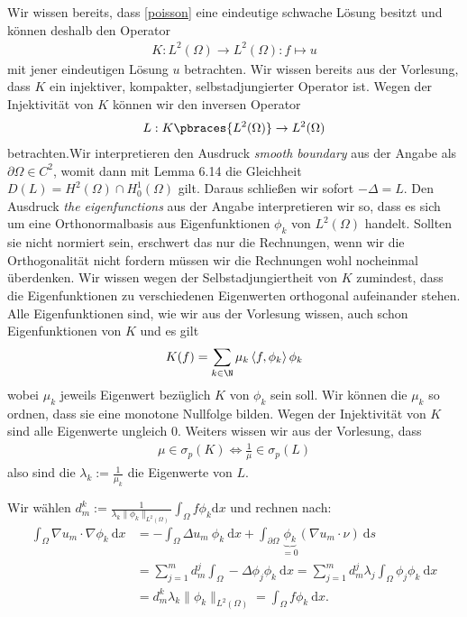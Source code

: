 \begin{solution}

	Wir wissen bereits, dass \eqref{poisson} eine eindeutige schwache Lösung besitzt und können deshalb den Operator
	\begin{align*}
	K: L^2(\Omega) \to L^2(\Omega): f \mapsto u
	\end{align*}
	mit jener eindeutigen Lösung $u$ betrachten. Wir wissen bereits aus der Vorlesung, dass $K$ ein injektiver, kompakter, selbstadjungierter Operator ist. Wegen der Injektivität von $K$ können wir den inversen Operator
	\begin{align*}
	L: K\pbraces{L^2(\Omega)} \to L^2(\Omega)
	\end{align*}
	betrachten.Wir interpretieren den Ausdruck \textit{smooth boundary} aus der Angabe als $\partial \Omega \in C^2$, womit dann mit Lemma 6.14 die Gleichheit $D(L) = H^2(\Omega) \cap H_0^1(\Omega)$ gilt. Daraus schließen wir sofort $-\Delta = L$. Den Ausdruck \textit{the eigenfunctions} aus der Angabe interpretieren wir so, dass es sich um eine Orthonormalbasis aus Eigenfunktionen $\phi_k$ von $L^2(\Omega)$ handelt. Sollten sie nicht normiert sein, erschwert das nur die Rechnungen, wenn wir die Orthogonalität nicht fordern müssen wir die Rechnungen wohl nocheinmal überdenken. Wir wissen wegen der Selbstadjungiertheit von $K$ zumindest, dass die Eigenfunktionen zu verschiedenen Eigenwerten orthogonal aufeinander stehen. Alle Eigenfunktionen sind, wie wir aus der Vorlesung wissen, auch schon Eigenfunktionen von $K$ und es gilt \begin{align*}
	K(f) = \sum_{k \in \N} \mu_k \left\langle f, \phi_k \right\rangle \phi_k
	\end{align*}
	wobei $\mu_k$ jeweils Eigenwert bezüglich $K$ von $\phi_k$ sein soll. Wir können die $\mu_k$ so ordnen, dass sie eine monotone Nullfolge bilden. Wegen der Injektivität von $K$ sind alle Eigenwerte ungleich $0$. Weiters wissen wir aus der Vorlesung, dass
	\begin{align*}
	\mu \in \sigma_p(K) \Leftrightarrow \frac{1}{\mu} \in \sigma_p(L)
	\end{align*}
	also sind die $\lambda_k := \frac{1}{\mu_k}$ die Eigenwerte von $L$.

  Wir wählen $d_m^k := \frac{1}{\lambda_k \|\phi_k\|_{L^2(\Omega)}} \int_\Omega f \phi_k \mathrm{d}x$ und rechnen nach:
  \begin{align*}
  \int_\Omega \nabla u_m \cdot \nabla \phi_k \mathrm{~d}x
  &= -\int_\Omega \Delta u_m~\phi_k \mathrm{~d}x + \int_{\partial\Omega} \underbrace{\phi_k}_{= 0} (\nabla u_m \cdot \nu) \mathrm{~d}s\\
  &= \sum_{j = 1}^m d_m^j \int_\Omega -\Delta \phi_j \phi_k \mathrm{~d}x
  = \sum_{j = 1}^m d_m^j \lambda_j \int_\Omega \phi_j \phi_k \mathrm{~d}x\\
  &= d_m^k \lambda_k \|\phi_k\|_{L^2(\Omega)} = \int_\Omega f \phi_k \mathrm{~d}x.
  \end{align*}


\end{solution}
